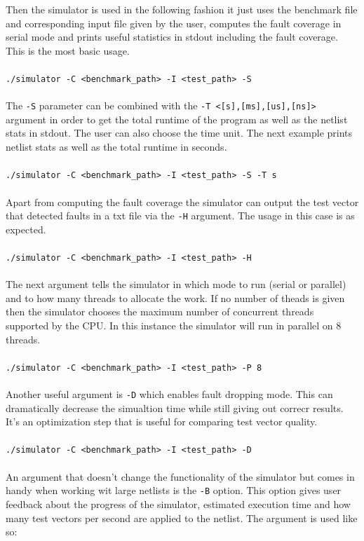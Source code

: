 \documentclass[a4paper,12pt]{article}
\begin{document}
Then the simulator is used in the following fashion it just uses the benchmark file and corresponding input file given by the user, computes the fault coverage in serial mode and prints useful statistics in stdout including the fault coverage. This is the most basic usage. 
\\\\ \texttt{./simulator -C <benchmark\_path> -I <test\_path> -S} \\\\
The \texttt{-S} parameter can be combined with the \texttt{-T <[s],[ms],[us],[ns]>} argument in order to get the total runtime of the program as well as the netlist stats in stdout. The user can also choose the time unit. The next example prints netlist stats as well as the total runtime in seconds.
\\\\ \texttt{./simulator -C <benchmark\_path> -I <test\_path> -S -T s} \\\\
Apart from computing the fault coverage the simulator can output the test vector that detected faults in a txt file via the \texttt{-H} argument. The usage in this case is as expected. 
\\\\ \texttt{./simulator -C <benchmark\_path> -I <test\_path> -H} \\\\
The next argument tells the simulator in which mode to run (serial or parallel) and to how many threads to allocate the work. If no number of theads is given then the simulator chooses the maximum number of concurrent threads supported by the CPU. In this instance the simulator will run in parallel on 8 threads.
\\\\ \texttt{./simulator -C <benchmark\_path> -I <test\_path> -P 8} \\\\
Another useful argument is \texttt{-D} which enables fault dropping mode. This can dramatically decrease the simualtion time while still giving out correcr results. It's an optimization step that is useful for comparing test vector quality.
\\\\ \texttt{./simulator -C <benchmark\_path> -I <test\_path> -D} \\\\
\clearpage
An argument that doesn't change the functionality of the simulator but comes in handy when working wit large netlists is the \texttt{-B} option. This option gives user feedback about the progress of the simulator, estimated execution time and how many test vectors per second are applied to the netlist. The argument is used like so:
\end{document}
